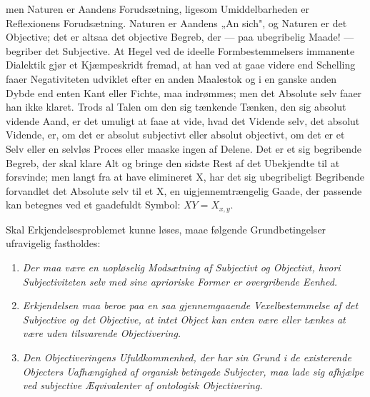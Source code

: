 \documentclass[12pt]{article}
\begin{document}
men Naturen er Aandens Forudsætning, ligesom Umiddelbar\-heden
er Reflexionens Forudsætning. Naturen er Aandens
„An sich", og Naturen er det Objective; det er altsaa det
objective Begreb, der --- paa ubegribelig Maade! --- begriber det
Subjective. At Hegel ved de ideelle Formbestemmelsers
immanente Dialektik gjør et Kjæmpeskridt fremad, at han ved at
gaae videre end Schelling faaer Negativiteten udviklet efter en
anden Maalestok og i en ganske anden Dybde end enten Kant
eller Fichte, maa indrømmes; men det Absolute selv faaer han
ikke klaret. Trods al Talen om den sig tænkende Tænken,
den sig absolut vidende Aand, er det umuligt at faae at vide,
hvad det Vidende selv, det absolut Vidende, er, om det er
absolut subjectivt eller absolut objectivt, om det er et Selv eller
en selvløs Proces eller maaske ingen af Delene. Det er et sig
begribende Begreb, der skal klare Alt og bringe den sidste
Rest af det Ubekjendte til at forsvinde; men langt fra at have
elimineret X, har det sig ubegribeligt Begribende forvandlet
det Absolute selv til et X, en uigjennemtrængelig Gaade, der
passende kan betegnes ved et gaadefuldt Symbol: $XY = X_{x,y}$.

Skal Erkjendelsesproblemet kunne løses, maae følgende
Grundbetingelser ufravigelig fastholdes:

\begin{enumerate}
\item[1)] \emph{Der maa være en uopløselig Modsætning af
  Subjectivt og Objectivt, hvori Subjectiviteten selv med sine
  aprioriske Former er overgribende Eenhed.}
\item[2)] \emph{Erkjendelsen maa beroe paa en saa
  gjennemgaaende Vexelbestemmelse af det Subjective og det Objective,
  at intet Object kan enten være eller tænkes at være uden
  tilsvarende Objectivering.}
\item[3)] \emph{Den Objectiveringens Ufuldkommenhed, der har
  sin Grund i de existerende Objecters Uafhængighed af organisk
  betingede Subjecter, maa lade sig afhjælpe ved subjective
  Æqvivalenter af ontologisk Objectivering.}
\end{enumerate}
\end{document}
